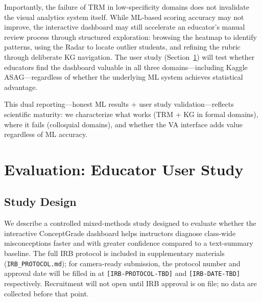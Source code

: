 \documentclass[journal,review]{vgtc}
\begin{document}
Importantly, the failure of TRM in low-specificity domains does not invalidate the visual analytics system itself. While ML-based scoring accuracy may not improve, the interactive dashboard may still accelerate an educator's manual review process through structured exploration: browsing the heatmap to identify patterns, using the Radar to locate outlier students, and refining the rubric through deliberate KG navigation. The user study (Section~\ref{sec:evaluation_user_study}) will test whether educators find the dashboard valuable in all three domains---including Kaggle ASAG---regardless of whether the underlying ML system achieves statistical advantage.

This dual reporting---honest ML results + user study validation---reflects scientific maturity: we characterize what works (TRM + KG in formal domains), where it fails (colloquial domains), and whether the VA interface adds value regardless of ML accuracy.


\section{Evaluation: Educator User Study} \label{sec:evaluation_user_study}

\subsection{Study Design}

We describe a controlled mixed-methods study designed to evaluate whether the interactive ConceptGrade dashboard helps instructors diagnose class-wide misconceptions faster and with greater confidence compared to a text-summary baseline. The full IRB protocol is included in supplementary materials (\texttt{IRB\_PROTOCOL.md}); for camera-ready submission, the protocol number and approval date will be filled in at \texttt{[IRB-PROTOCOL-TBD]} and \texttt{[IRB-DATE-TBD]} respectively. Recruitment will not open until IRB approval is on file; no data are collected before that point.
\end{document}
